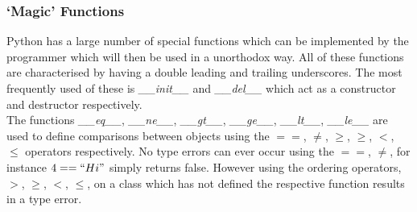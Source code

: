 \documentclass[12pt, titlepage]{article}
\begin{document}
\subsubsection{`Magic' Functions}
Python has a large number of special functions which can be implemented by the programmer which will then be used in a unorthodox way. All of these functions are characterised by having a double leading and trailing underscores. The most frequently used of these is \textit{\_\_init\_\_} and \textit{\_\_del\_\_} which act as a constructor and destructor respectively. \\
The functions \textit{\_\_eq\_\_}, \textit{\_\_ne\_\_}, \textit{\_\_gt\_\_}, \textit{\_\_ge\_\_}, \textit{\_\_lt\_\_}, \textit{\_\_le\_\_} are used to define comparisons between objects using the $==$, $\neq$, $\ge$, $\geq$, $<$, $\leq$ operators respectively. No type errors can ever occur using the $==$, $\neq$, for instance $4 == ``Hi"$ simply returns false. However using the ordering operators, $>$, $\geq$, $<$, $\leq$, on a class which has not defined the respective function results in a type error.
\end{document}

